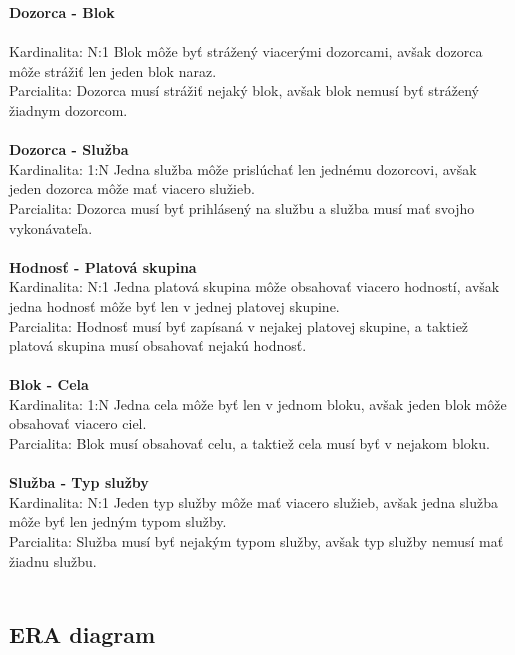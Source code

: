\documentclass[slovak, 12pt, Times New Roman]{article}
\begin{document}
			\textbf{Dozorca - Blok} \\ \\
				Kardinalita: N:1 Blok môže byť strážený viacerými dozorcami, avšak dozorca môže strážiť len jeden blok naraz.\\
				Parcialita: Dozorca musí strážiť nejaký blok, avšak blok nemusí byť strážený žiadnym dozorcom.\\ \\
			\textbf{Dozorca - Služba} \\
				Kardinalita: 1:N Jedna služba môže prislúchať len jednému dozorcovi, avšak jeden dozorca môže mať viacero služieb.\\
				Parcialita: Dozorca musí byť prihlásený na službu a služba musí mať svojho vykonávateľa.\\ \\
			\textbf{Hodnosť - Platová skupina} \\
				Kardinalita: N:1 Jedna platová skupina môže obsahovať viacero hodností, avšak jedna hodnosť môže byť len v jednej platovej 
				skupine.\\
				Parcialita: Hodnosť musí byť zapísaná v nejakej platovej skupine, a taktiež platová skupina musí obsahovať nejakú hodnosť.\\ \\
			\textbf{Blok - Cela} \\
				Kardinalita: 1:N Jedna cela môže byť len v jednom bloku, avšak jeden blok môže obsahovať viacero ciel.\\
				Parcialita: Blok musí obsahovať celu, a taktiež cela musí byť v nejakom bloku.\\ \\
			\textbf{Služba - Typ služby} \\
				Kardinalita: N:1 Jeden typ služby môže mať viacero služieb, avšak jedna služba môže byť len jedným typom služby.\\
				Parcialita: Služba musí byť nejakým typom služby, avšak typ služby nemusí mať žiadnu službu.\\ \\
		\subsection{ERA diagram}
\end{document}
